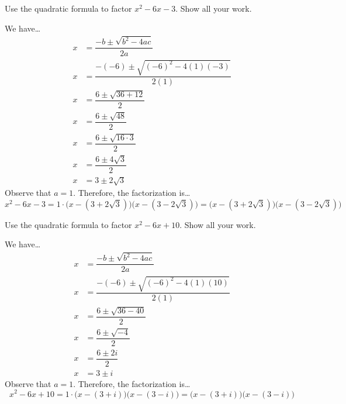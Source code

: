 \documentclass[11pt,letterpaper]{article}
\begin{document}

 Use the quadratic formula to factor $x^2 - 6x - 3$. Show all your work. \pspace

\sol We have\dots \pspace
	\[
	\begin{aligned}
	x&= \dfrac{-b \pm \sqrt{b^2 - 4ac}}{2a} \\[0.3cm]
	x&= \dfrac{-(-6) \pm \sqrt{(-6)^2 - 4(1)(-3)}}{2(1)} \\[0.3cm]
	x&= \dfrac{6 \pm \sqrt{36 + 12}}{2} \\[0.3cm]
	x&= \dfrac{6 \pm \sqrt{48}}{2} \\[0.3cm]
	x&= \dfrac{6 \pm \sqrt{16 \cdot 3}}{2} \\[0.3cm]
	x&= \dfrac{6 \pm 4\sqrt{3}}{2} \\[0.3cm]
	x&= 3 \pm 2 \sqrt{3}
	\end{aligned}
	\] \pspace
Observe that $a= 1$. Therefore, the factorization is\dots
	\[
	x^2 - 6x - 3= 1 \cdot \big(x - (3 + 2\sqrt{3}) \big) \big(x - (3 - 2\sqrt{3}) \big)= \big(x - (3 + 2\sqrt{3}) \big) \big(x - (3 - 2\sqrt{3}) \big)
	\]





\newpage





 Use the quadratic formula to factor $x^2 - 6x + 10$. Show all your work. \pspace

\sol We have\dots \pspace
	\[
	\begin{aligned}
	x&= \dfrac{-b \pm \sqrt{b^2 - 4ac}}{2a} \\[0.3cm]
	x&= \dfrac{-(-6) \pm \sqrt{(-6)^2 - 4(1)(10)}}{2(1)} \\[0.3cm]
	x&= \dfrac{6 \pm \sqrt{36 - 40}}{2} \\[0.3cm]
	x&= \dfrac{6 \pm \sqrt{-4}}{2} \\[0.3cm]
	x&= \dfrac{6 \pm 2i}{2} \\[0.3cm]
	x&= 3 \pm i
	\end{aligned}
	\] \pspace
Observe that $a= 1$. Therefore, the factorization is\dots
	\[
	x^2 - 6x + 10= 1 \cdot \big(x - (3 + i) \big) \big(x - (3 - i) \big)= \big(x - (3 + i) \big) \big(x - (3 - i) \big)
	\]





\newpage
\end{document}
